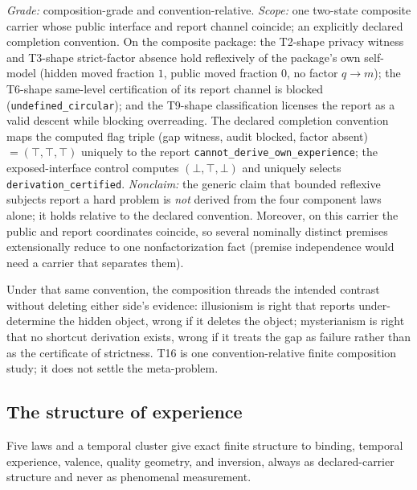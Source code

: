 \begin{theorem}
\gradeS{} \emph{Grade:} composition-grade and convention-relative.
\emph{Scope:} one two-state composite carrier whose public interface and
report channel coincide; an explicitly declared completion convention. On the
composite package: the T2-shape privacy witness and T3-shape strict-factor
absence hold reflexively of the package's own self-model (hidden moved
fraction $1$, public moved fraction $0$, no factor $q \to m$); the T6-shape
same-level certification of its report channel is blocked
(\texttt{undefined\_circular}); and the T9-shape classification licenses the
report as a valid descent while blocking overreading. The declared completion
convention maps the computed flag triple (gap witness, audit blocked, factor
absent) $=(\top,\top,\top)$ uniquely to the report
\texttt{cannot\_derive\_own\_experience}; the exposed-interface control
computes $(\bot,\top,\bot)$ and uniquely selects
\texttt{derivation\_certified}. \emph{Nonclaim:} the generic claim that
bounded reflexive subjects report a hard problem is \emph{not} derived from
the four component laws alone; it holds relative to the declared
convention. Moreover, on this carrier the public and report coordinates coincide,
so several nominally distinct premises extensionally reduce to one
nonfactorization fact (premise independence would need a carrier that
separates them).
\end{theorem}

Under that same convention, the composition threads the intended contrast
without deleting either side's evidence: illusionism is right that reports
under-determine the hidden object, wrong if it deletes the object;
mysterianism is right that no shortcut derivation exists, wrong if it treats
the gap as failure rather than as the certificate of strictness. T16 is one
convention-relative finite composition study; it does not settle the
meta-problem.

\subsection{The structure of experience}
\label{sec:structure}

Five laws and a temporal cluster give exact finite structure to binding,
temporal experience, valence, quality geometry, and inversion, always as
declared-carrier structure and never as phenomenal measurement.


